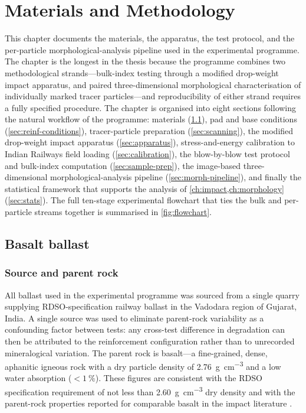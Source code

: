 \chapter{Materials and Methodology}
\label{ch:methodology}

This chapter documents the materials, the apparatus, the test protocol, and the per-particle morphological-analysis pipeline used in the experimental programme. The chapter is the longest in the thesis because the programme combines two methodological strands---bulk-index testing through a modified drop-weight impact apparatus, and paired three-dimensional morphological characterisation of individually marked tracer particles---and reproducibility of either strand requires a fully specified procedure. The chapter is organised into eight sections following the natural workflow of the programme: materials (\cref{sec:basalt}), pad and base conditions (\cref{sec:reinf-conditions}), tracer-particle preparation (\cref{sec:scanning}), the modified drop-weight impact apparatus (\cref{sec:apparatus}), stress-and-energy calibration to Indian Railways field loading (\cref{sec:calibration}), the blow-by-blow test protocol and bulk-index computation (\cref{sec:sample-prep}), the image-based three-dimensional morphological-analysis pipeline (\cref{sec:morph-pipeline}), and finally the statistical framework that supports the analysis of \cref{ch:impact,ch:morphology} (\cref{sec:stats}). The full ten-stage experimental flowchart that ties the bulk and per-particle streams together is summarised in \cref{fig:flowchart}.

\section{Basalt ballast}
\label{sec:basalt}

\subsection{Source and parent rock}
\label{sec:source}

All ballast used in the experimental programme was sourced from a single quarry supplying RDSO-specification railway ballast in the Vadodara region of Gujarat, India. A single source was used to eliminate parent-rock variability as a confounding factor between tests: any cross-test difference in degradation can then be attributed to the reinforcement configuration rather than to unrecorded mineralogical variation. The parent rock is basalt---a fine-grained, dense, aphanitic igneous rock with a dry particle density of \qty{2.76}{\g\per\cm\cubed} and a low water absorption ($<\qty{1}{\percent}$). These figures are consistent with the RDSO specification \citep{rdso2023} requirement of not less than \qty{2.60}{\g\per\cm\cubed} dry density and with the parent-rock properties reported for comparable basalt in the impact literature \citep{koohmishi2020,zhang2023}.

